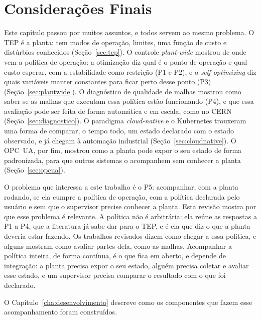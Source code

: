
\section{Considerações Finais}
\label{sec:ref_conclusao}

Este capítulo passou por muitos assuntos, e todos servem ao mesmo problema. O TEP é a planta: tem modos de operação, limites, uma função de custo e distúrbios conhecidos (Seção~\ref{sec:tep}). O controle \textit{plant-wide} mostrou de onde vem a política de operação: a otimização diz qual é o ponto de operação e qual custo esperar, com a estabilidade como restrição (P1 e P2), e o \textit{self-optimizing} diz quais variáveis manter constantes para ficar perto desse ponto (P3) (Seção~\ref{sec:plantwide}). O diagnóstico de qualidade de malhas mostrou como saber se as malhas que executam essa política estão funcionando (P4), e que essa avaliação pode ser feita de forma automática e em escala, como no CERN (Seção~\ref{sec:diagnostico}). O paradigma \textit{cloud-native} e o Kubernetes trouxeram uma forma de comparar, o tempo todo, um estado declarado com o estado observado, e já chegam à automação industrial (Seção~\ref{sec:cloudnative}). O OPC~UA, por fim, mostrou como a planta pode expor o seu estado de forma padronizada, para que outros sistemas o acompanhem sem conhecer a planta (Seção~\ref{sec:opcua}).

O problema que interessa a este trabalho é o P5: acompanhar, com a planta rodando, se ela cumpre a política de operação, com a política declarada pelo usuário e sem que o supervisor precise conhecer a planta. Esta revisão mostra por que esse problema é relevante. A política não é arbitrária: ela reúne as respostas a P1 a P4, que a literatura já sabe dar para o TEP, e é ela que diz o que a planta deveria estar fazendo. Os trabalhos revisados dizem como chegar a essa política, e alguns mostram como avaliar partes dela, como as malhas. Acompanhar a política inteira, de forma contínua, é o que fica em aberto, e depende de integração: a planta precisa expor o seu estado, alguém precisa coletar e avaliar esse estado, e um supervisor precisa comparar o resultado com o que foi declarado.

O Capítulo~\ref{cha:desenvolvimento} descreve como os componentes que fazem esse acompanhamento foram construídos.
